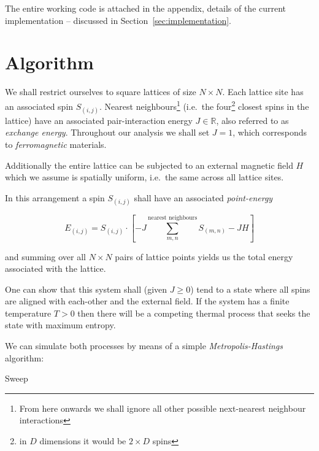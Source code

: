 \documentclass[12pt]{article}
\begin{document}
The entire working code is attached in the appendix, details of the current implementation -- discussed in Section~\ref{sec:implementation}.

\section{Algorithm}\label{sec:algorithm}

We shall restrict ourselves to square lattices of size \(N \times N\). Each lattice site has an associated spin \(S_{(i, j)}\). Nearest neighbours\footnote{From here onwards we shall ignore all other possible next-nearest neighbour interactions} (i.e.~the four\footnote{in \(D\) dimensions it would be \(2 \times D\) spins} closest spins in the lattice) have an associated pair-interaction energy \(J \in \mathbb{R}\), also referred to as \emph{exchange energy}. Throughout our analysis we shall set \( J =1\), which corresponds to \emph{ferromagnetic} materials.

Additionally the entire lattice can be subjected to an external magnetic field \(H\) which we assume is spatially uniform, i.e.~the same across all lattice sites. 

In this arrangement a spin \( S_{(i, j)}\) shall have an associated \emph{point-energy}

\begin{equation}\label{eq:point_energy}
  E_{(i, j)} = S_{(i, j)} \cdot \left[ -J  \sum_{m, n}^{\text{nearest neighbours}} S_{(m,n)} - JH \right] 
\end{equation}

and summing over all \(N \times N\) pairs of lattice points yields us the total energy associated with the lattice.

One can show that this system shall (given \(J \geq 0\)) tend to a state where all spins are aligned with each-other and the external field. If the system has a finite temperature \(T>0\) then there will be a competing thermal process that seeks the state with maximum entropy.

We can simulate both processes by means of a simple \emph{Metropolis-Hastings} algorithm:\cite{Hastings1970}

\begin{algorithm}
  \caption{Sweep}\label{euclid}
\begin{algorithmic}[1]
  \EndIf
  \EndFor
  \EndProcedure
\end{algorithmic}
\end{algorithm}
\end{document}
